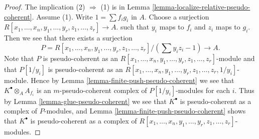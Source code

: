 \documentclass[10pt,a4paper]{amsart}
\theoremstyle{plain}
\theoremstyle{definition}
\theoremstyle{remark}
\numberwithin{equation}{subsection}
\begin{document}
\begin{proof}
The implication (2) $\Rightarrow$ (1) is in
Lemma \ref{lemma-localize-relative-pseudo-coherent}.
Assume (1). Write $1 = \sum f_ig_i$ in $A$.
Choose a surjection
$R[x_1, \ldots, x_n, y_1, \ldots, y_r, z_1, \ldots, z_r] \to A$.
such that $y_i$ maps to $f_i$ and $z_i$ maps to $g_i$. Then we
see that there exists a surjection
$$
P = R[x_1, \ldots, x_n, y_1, \ldots, y_r, z_1, \ldots, z_r]/(\sum y_iz_i - 1)
\longrightarrow
A.
$$
Note that $P$ is pseudo-coherent as an
$R[x_1, \ldots, x_n, y_1, \ldots, y_r, z_1, \ldots, z_r]$-module
and that $P[1/y_i]$ is pseudo-coherent as an
$R[x_1, \ldots, x_n, y_1, \ldots, y_r, z_1, \ldots, z_r, 1/y_i]$-module.
Hence by
Lemma \ref{lemma-finite-push-pseudo-coherent}
we see that
$K^\bullet \otimes_A A_{f_i}$ is an $m$-pseudo-coherent complex
of $P[1/y_i]$-modules for each $i$.
Thus by
Lemma \ref{lemma-glue-pseudo-coherent}
we see that $K^\bullet$ is pseudo-coherent as a complex of
$P$-modules, and
Lemma \ref{lemma-finite-push-pseudo-coherent}
shows that  $K^\bullet$ is pseudo-coherent as a complex of
$R[x_1, \ldots, x_n, y_1, \ldots, y_r, z_1, \ldots, z_r]$-modules.
\end{proof}
\end{document}
